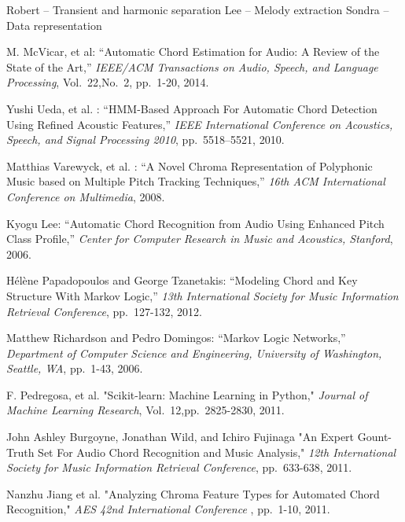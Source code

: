 \documentclass{article}
\begin{document}
Robert -- Transient and harmonic separation \newline
Lee -- Melody extraction \newline
Sondra -- Data representation \newline

\begin{thebibliography}{citations}

M. McVicar, et al:
``Automatic Chord Estimation for Audio: A Review of the State of the Art,''
{\it IEEE/ACM Transactions on Audio, Speech, and Language Processing},
Vol.~22,No.~2, pp.~1-20, 2014.

Yushi Ueda, et al. :
``HMM-Based Approach For Automatic Chord Detection Using Refined Acoustic
Features,''
{\it IEEE International Conference on Acoustics, Speech, and Signal
Processing 2010},
pp.~5518--5521, 2010.

Matthias Varewyck, et al. :
``A Novel Chroma Representation of Polyphonic Music based on Multiple Pitch
Tracking Techniques,''
{\it 16th ACM International Conference on Multimedia},
2008.

Kyogu Lee:
``Automatic Chord Recognition from Audio Using Enhanced Pitch Class Profile,''
{\it Center for Computer Research in Music and Acoustics, Stanford},
2006.

Hélène Papadopoulos and George Tzanetakis:
``Modeling Chord and Key Structure With Markov Logic,''
{\it 13th International Society for Music Information Retrieval Conference},
pp.~127-132, 2012.

Matthew Richardson and Pedro Domingos:
``Markov Logic Networks,''
{\it Department of Computer Science and Engineering, University of Washington,
Seattle, WA},
pp.~1-43, 2006.

F. Pedregosa, et al.
"Scikit-learn: Machine Learning in Python,"
{\it Journal of Machine Learning Research},
Vol.~12,pp.~2825-2830, 2011.

John Ashley Burgoyne, Jonathan Wild, and Ichiro Fujinaga
"An Expert Gount-Truth Set For Audio Chord Recognition and Music Analysis,"
{\it 12th International Society for Music Information Retrieval Conference},
pp.~633-638, 2011.

Nanzhu Jiang et al.
"Analyzing Chroma Feature Types for Automated Chord Recognition,"
{\it AES 42nd International Conference },
pp.~1-10, 2011.


\end{thebibliography}
\end{document}
